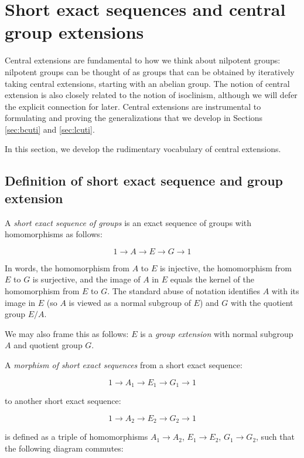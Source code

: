 

\section{Short exact sequences and central group extensions}\label{sec:ses-group}

Central extensions are fundamental to how we think about nilpotent
groups: nilpotent groups can be thought of as groups that can be
obtained by iteratively taking central extensions, starting with an
abelian group. The notion of central extension is also closely related
to the notion of isoclinism, although we will defer the explicit
connection for later. Central extensions are instrumental to
formulating and proving the generalizations that we develop in
Sections \ref{sec:bcuti} and \ref{sec:lcuti}.

In this section, we develop the rudimentary vocabulary of central
extensions.

\subsection{Definition of short exact sequence and group extension}

A {\em short exact sequence of groups} is an exact sequence of groups
with homomorphisms as follows:

$$1 \to A \to E \to G \to 1$$

In words, the homomorphism from $A$ to $E$ is injective, the
homomorphism from $E$ to $G$ is surjective, and the image of $A$ in
$E$ equals the kernel of the homomorphism from $E$ to $G$. The
standard abuse of notation identifies $A$ with its image in $E$ (so
$A$ is viewed as a normal subgroup of $E$) and $G$ with the quotient
group $E/A$.

We may also frame this as follows: $E$ is a {\em group extension} with
normal subgroup $A$ and quotient group $G$.

A {\em morphism of short exact sequences} from a short exact sequence:

$$1 \to A_1 \to E_1 \to G_1 \to 1$$

to another short exact sequence:

$$1 \to A_2 \to E_2 \to G_2 \to 1$$

is defined as a triple of homomorphisms $A_1 \to A_2$, $E_1 \to E_2$,
$G_1 \to G_2$, such that the following diagram commutes:

